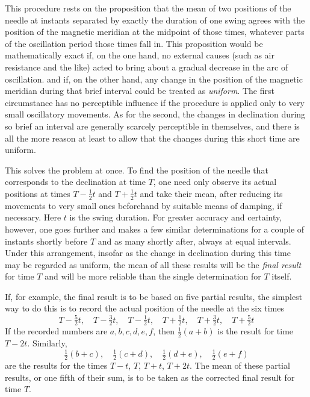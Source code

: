 This procedure rests on the proposition that the mean of two positions of the needle at instants separated by exactly the duration of one swing agrees with the position of the magnetic meridian at the midpoint of those times, whatever parts of the oscillation period those times fall in. This proposition would be mathematically exact if, on the one hand, no external causes (such as air resistance and the like) acted to bring about a gradual decrease in the arc of oscillation. and if, on the other hand, any change in the position of the magnetic meridian during that brief interval could be treated as \textit{uniform}. The first circumstance has no perceptible influence if the procedure is applied only to very small oscillatory movements. As for the second, the changes in declination during so brief an interval are generally scarcely perceptible in themselves, and there is all the more reason at least to allow that the changes during this short time are uniform.

This solves the problem at once. To find the position of the needle that corresponds to the declination at time $T$, one need only observe its actual positions at times $T-\tfrac12t$ and $T+\tfrac12t$ and take their mean, after reducing its movements to very small ones beforehand by suitable means of damping, if necessary. Here $t$ is the swing duration. For greater accuracy and certainty, however, one goes further and makes a few similar determinations for a couple of instants shortly before $T$ and as many shortly after, always at equal intervals. Under this arrangement, insofar as the change in declination during this time may be regarded as uniform, the mean of all these results will be the \textit{final result} for time $T$ and will be more reliable than the single determination for $T$ itself.

If, for example, the final result is to be based on five partial results, the simplest way to do this is to record the actual position of the needle at the six times
\[
T-\tfrac52t,\quad T-\tfrac32t,\quad T-\tfrac12t,\quad T+\tfrac12t,\quad T+\tfrac32t,\quad T+\tfrac52t
\]
If the recorded numbers are $a,b,c,d,e,f$, then $\tfrac12(a+b)$ is the result for time $T-2t$. Similarly,
\[
\tfrac12(b+c),\quad\tfrac12(c+d),\quad\tfrac12(d+e),\quad\tfrac12(e+f)
\]
are the results for the times $T-t$, $T$, $T+t$, $T+2t$. The mean of these partial
results, or one fifth of their sum, is to be taken as the corrected final result for time $T$.

